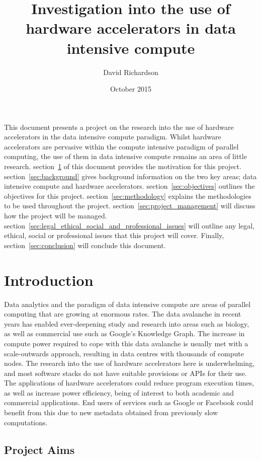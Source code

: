 \documentclass[12pt,a4paper]{article}
\title{Investigation into the use of hardware accelerators in data intensive compute}
\author{David Richardson}
\date{October 2015}
\begin{document}
	\maketitle

	This document presents a project on the research into the use of hardware accelerators in the data intensive compute paradigm. Whilst hardware accelerators are pervasive within the compute intensive paradigm of parallel computing, the use of them in data intensive compute remains an area of little research. section~\ref{sec:introduction} of this document provides the motivation for this project. section~\ref{sec:background} gives background information on the two key areas; data intensive compute and hardware accelerators. section~\ref{sec:objectives} outlines the objectives for this project. section~\ref{sec:methodology} explains the methodologies to be used throughout the project. section~\ref{sec:project_management} will discuss how the project will be managed. section~\ref{sec:legal_ethical_social_and_professional_issues} will outline any legal, ethical, social or professional issues that this project will cover. Finally, section~\ref{sec:conclusion} will conclude this document.

	\section{Introduction} %
	\label{sec:introduction}

		Data analytics and the paradigm of data intensive compute are areas of parallel computing that are growing at enormous rates. The data avalanche in recent years has enabled ever-deepening study and research into areas such as biology, as well as commercial use such as Google's Knowledge Graph. The increase in compute power required to cope with this data avalanche is usually met with a scale-outwards approach, resulting in data centres with thousands of compute nodes. The research into the use of hardware accelerators here is underwhelming, and most software stacks do not have suitable provisions or APIs for their use. The applications of hardware accelerators could reduce program execution times, as well as increase power efficiency, being of interest to both academic and commercial applications. End users of services such as Google or Facebook could benefit from this due to new metadata obtained from previously slow computations.

		\subsection{Project Aims} %
		\label{sub:project_aims}
\end{document}
